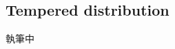 \documentclass[../main]{subfiles}
\begin{document}
\setcounter{subsection}{1} \addtocounter{subsection}{-1}
\subsection{Tempered distribution}
執筆中
\end{document}
